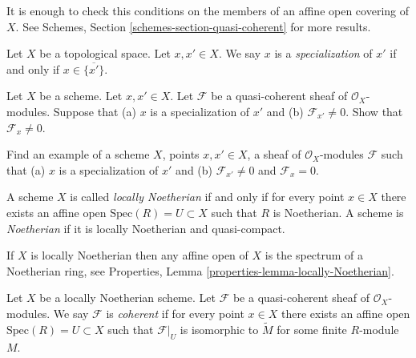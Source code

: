 \noindent
It is enough to check this conditions on the members of an
affine open covering of $X$.
See Schemes, Section \ref{schemes-section-quasi-coherent}
for more results.

\begin{definition}
\label{definition-specialization}
Let $X$ be a topological space. Let $x, x' \in X$.
We say $x$ is a {\it specialization} of $x'$
if and only if $x \in \overline{\{x'\}}$.
\end{definition}

\begin{exercise}
\label{exercise-quasi-coherent-specialization-points}
Let $X$ be a scheme. Let $x, x' \in X$. Let $\mathcal{F}$ be
a quasi-coherent sheaf of $\mathcal{O}_X$-modules.
Suppose that (a) $x$ is a specialization of $x'$ and (b)
$\mathcal{F}_{x'} \not = 0$. Show that $\mathcal{F}_x \not = 0$.
\end{exercise}

\begin{exercise}
\label{exercise-O-module-specialization-points}
Find an example of a scheme $X$, points $x, x' \in X$,
a sheaf of $\mathcal{O}_X$-modules
$\mathcal{F}$ such that (a) $x$ is a specialization of $x'$ and (b)
$\mathcal{F}_{x'} \not = 0$ and $\mathcal{F}_x = 0$.
\end{exercise}

\begin{definition}
\label{definition-Noetherian-scheme}
A scheme $X$ is called {\it locally Noetherian} if and only if
for every point $x \in X$ there exists an affine open
$\text{Spec}(R) = U \subset X$ such that $R$ is Noetherian.
A scheme is {\it Noetherian} if it is locally Noetherian and quasi-compact.
\end{definition}

\noindent
If $X$ is locally Noetherian then any affine open of $X$
is the spectrum of a Noetherian ring, see
Properties, Lemma \ref{properties-lemma-locally-Noetherian}.

\begin{definition}
\label{definition-coherent}
Let $X$ be a locally Noetherian scheme.
Let $\mathcal{F}$ be a quasi-coherent sheaf of
$\mathcal{O}_X$-modules. We say $\mathcal{F}$ is {\it coherent}
if for every point $x \in X$ there exists an affine open
$\text{Spec}(R) = U \subset X$ such that $\mathcal{F}|_U$
is isomorphic to $\widetilde M$ for some finite $R$-module $M$.
\end{definition}

